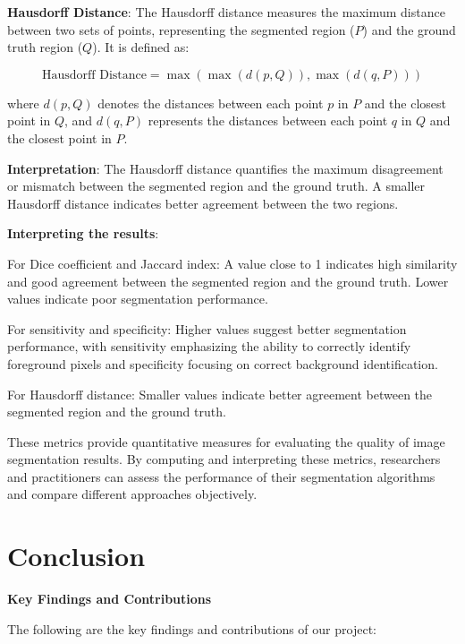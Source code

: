 \documentclass[]{report}
\begin{document}
\textbf{Hausdorff Distance}:
The Hausdorff distance measures the maximum distance between two sets of points, representing the segmented region (\(P\)) and the ground truth region (\(Q\)). It is defined as:

\[ \text{Hausdorff Distance} = \max(\max(d(p, Q)), \max(d(q, P))) \]

where \(d(p, Q)\) denotes the distances between each point \(p\) in \(P\) and the closest point in \(Q\), and \(d(q, P)\) represents the distances between each point \(q\) in \(Q\) and the closest point in \(P\).

\textbf{Interpretation}: The Hausdorff distance quantifies the maximum disagreement or mismatch between the segmented region and the ground truth. A smaller Hausdorff distance indicates better agreement between the two regions.\newline\newline

\textbf{Interpreting the results}:

For Dice coefficient and Jaccard index: A value close to 1 indicates high similarity and good agreement between the segmented region and the ground truth. Lower values indicate poor segmentation performance.

For sensitivity and specificity: Higher values suggest better segmentation performance, with sensitivity emphasizing the ability to correctly identify foreground pixels and specificity focusing on correct background identification.

For Hausdorff distance: Smaller values indicate better agreement between the segmented region and the ground truth.

These metrics provide quantitative measures for evaluating the quality of image segmentation results. By computing and interpreting these metrics, researchers and practitioners can assess the performance of their segmentation algorithms and compare different approaches objectively.

\chapter*{Conclusion}

\textbf{Key Findings and Contributions}

The following are the key findings and contributions of our project:
\end{document}
